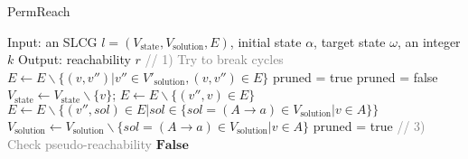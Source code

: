 
\begin{algorithm}
  \caption{PermReach}
  \begin{algorithmic}[1]
   \State Input: an SLCG $l=(V_{\mathrm{state}},V_{\mathrm{solution}}, E)$, initial state $\alpha$, target state $\omega$, an integer $k$
\State Output: reachability $r$
\State \textcolor{gray}{// 1) Try to break cycles}%
                \State $E\gets E\backslash \{(v,v'')|v''\in V'_{\mathrm{solution}},(v,v'')\in E\}$
            \EndIf
        \EndFor
    \EndIf
\EndFor %
\State{\textcolor{gray}{// 2) Remove useless nodes/edges}} %
\State pruned = true
    \State pruned = false
            \State $V_{\mathrm{state}} \gets V_{\mathrm{state}}\backslash \{v\}$; $E\gets E\backslash \{ (v'',v)\in E\}$
            \State $E\gets E\backslash \{ (v'',sol)\in E | sol \in \{sol = (A \rightarrow a) \in V_{\mathrm{solution}} | v \in A\}\}$
            \State $V_{\mathrm{solution}} \gets V_{\mathrm{solution}}\backslash \{sol = (A \rightarrow a) \in V_{\mathrm{solution}} | v \in A\}$
            \State pruned = true
        \EndIf
    \EndFor %
\EndWhile
\State \textcolor{gray}{// 3) Check pseudo-reachability} %
    \State \Return $\mathbf{False}$
\EndIf %

  \end{algorithmic}
\end{algorithm}

